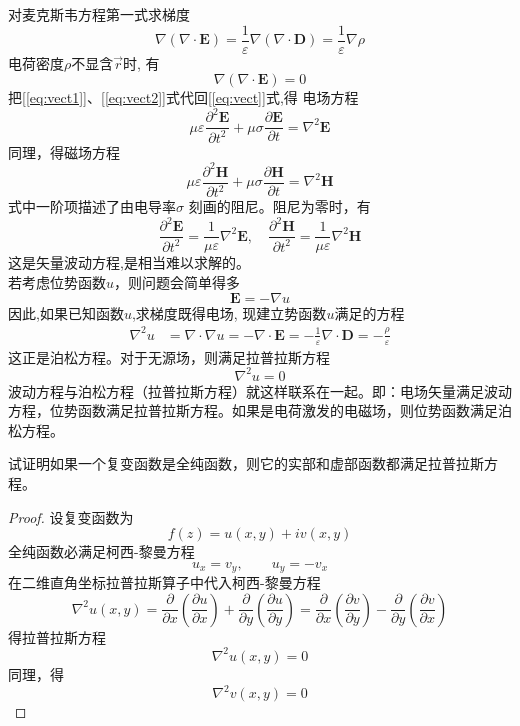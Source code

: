 对麦克斯韦方程第一式求梯度
  $$
  \nabla(\nabla \cdot \mathbf{E})=\frac{1}{\varepsilon} \nabla(\nabla \cdot \mathbf{D})=\frac{1}{\varepsilon} \nabla \rho
  $$
  电荷密度$\rho$不显含$\vec{r}$时, 有
  \begin{equation}\label{eq:vect2}
  \nabla(\nabla \cdot \mathbf{E})=0
  \end{equation}  
把[\ref{eq:vect1}]、[\ref{eq:vect2}]式代回[\ref{eq:vect}]式,得
电场方程
\begin{equation}
	\mu \varepsilon \frac{\partial^2 \mathbf{E}}{\partial t^2}+\mu \sigma \frac{\partial \mathbf{E}}{\partial t}=\nabla^2 \mathbf{E}
	\end{equation}
同理，得磁场方程
\begin{equation}
	\mu \varepsilon \frac{\partial^2 \mathbf{H}}{\partial t^2}+\mu \sigma \frac{\partial \mathbf{H}}{\partial t}=\nabla^2 \mathbf{H}
	\end{equation}
	式中一阶项描述了由电导率$ \sigma  $ 刻画的阻尼。阻尼为零时，有
	$$
	\frac{\partial^2 \mathbf{E}}{\partial t^2}=\frac{1}{\mu \varepsilon} \nabla^2 \mathbf{E}, \quad \frac{\partial^2 \mathbf{H}}{\partial t^2}=\frac{1}{\mu \varepsilon} \nabla^2 \mathbf{H}
	$$
	这是矢量波动方程,是相当难以求解的。  
\\
若考虑位势函数$u$，则问题会简单得多
$$
\mathbf{E}=-\nabla u
$$
因此,如果已知函数$u$,求梯度既得电场, 现建立势函数$u$满足的方程
\begin{equation*}
\begin{aligned}
	\nabla^2 u &= \nabla \cdot \nabla u =-\nabla \cdot \mathbf{E} 
	=-\frac{1}{\varepsilon} \nabla \cdot \mathbf{D} 
	=-\frac{\rho}{\varepsilon}
\end{aligned}
\end{equation*}
这正是泊松方程。对于无源场，则满足拉普拉斯方程
$$
\nabla^2 u =0 
$$ 
波动方程与泊松方程（拉普拉斯方程）就这样联系在一起。即：电场矢量满足波动方程，位势函数满足拉普拉斯方程。如果是电荷激发的电磁场，则位势函数满足泊松方程。
\begin{example}
	试证明如果一个复变函数是全纯函数，则它的实部和虚部函数都满足拉普拉斯方程。
\end{example}
\begin{proof}
	设复变函数为
	\[ f(z) =u(x,y) + i v(x,y)\]
	全纯函数必满足柯西-黎曼方程
	\[ u_x = v_y, \qquad  u_y = - v_x\]
	在二维直角坐标拉普拉斯算子中代入柯西-黎曼方程 
	\[ \nabla^2 u(x,y) = \frac{\partial}{\partial x} (\frac{\partial u}{\partial x}) + \frac{\partial}{\partial y} (\frac{\partial u}{\partial y})  = \frac{\partial}{\partial x} (\frac{\partial v}{\partial y}) - \frac{\partial}{\partial y} (\frac{\partial v}{\partial x}) \]
	得拉普拉斯方程
	\[ \nabla^2 u(x,y)  =0\]
	同理，得 
	\[ \nabla^2 v(x,y)  =0\]
\end{proof}

